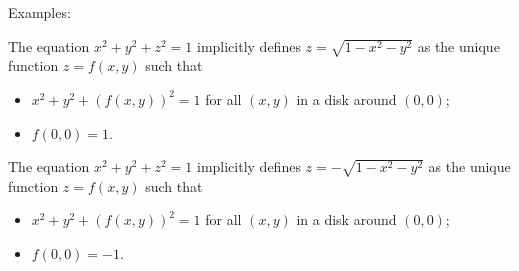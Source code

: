 Examples:

The equation $x^2+y^2+z^2 = 1$ implicitly defines $z=\sqrt{1-x^2-y^2}$ as the unique function $z=f(x,y)$ such that
%
\begin{itemize}
  \item $x^2+ y^2+(f(x,y))^2 = 1$ for all $(x,y)$ in a disk around $(0,0)$;
  \item $f(0,0) = 1$.
\end{itemize}

The equation $x^2+y^2+z^2 = 1$ implicitly defines $z=-\sqrt{1-x^2-y^2}$ as the unique function $z=f(x,y)$ such that
%
\begin{itemize}
  \item $x^2+ y^2+(f(x,y))^2 = 1$ for all $(x,y)$ in a disk around $(0,0)$;
  \item $f(0,0) = -1$.
\end{itemize}